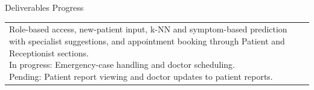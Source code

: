 \documentclass[12pt,a4paper]{article}
\newcommand{\sectiontitle}[1]{%
    {\color{GEUBlue}
    \fontsize{18}{22}\selectfont #1}
}
\newcommand{\answerbox}[2]{%
    \begin{tabularx}{\textwidth}{
        |>{\raggedright\arraybackslash}X|}
        \hline
        \parbox[t][#1][t]{\dimexpr\linewidth-12pt\relax}{
            \vspace{5pt}
            \fontsize{11}{13}\selectfont #2
        }\\
        \hline
    \end{tabularx}
}
\begin{document}
\vspace{0.65cm}

\sectiontitle{Deliverables Progress}

\vspace{0.05cm}

\vspace{0.25cm}

\answerbox{3.20cm}{{Completed:} Role-based access, new-patient input, k-NN and
symptom-based prediction with specialist suggestions, and appointment
booking through Patient and Receptionist sections.\\[2pt]
{In progress:} Emergency-case handling and doctor scheduling.\\[2pt]
{Pending:} Patient report viewing and doctor updates to patient reports.}
\end{document}
